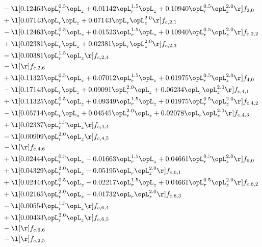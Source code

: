 \begin{alignat}{2}
& - \l[  0.12463 \opL_r^{0.5} \opL_z +  0.01142 \opL_r^{1.5} \opL_z +  0.10940 \opL_r^{0.5} \opL_z^{2.0}  \r] f_{2,0} \nonumber \\ 
& + \l[  0.07143 \opL_r \opL_z +  0.07143 \opL_r \opL_z^{2.0}  \r] f_{c,2,1} \nonumber \\ 
& - \l[  0.12463 \opL_r^{0.5} \opL_z +  0.01523 \opL_r^{1.5} \opL_z +  0.10940 \opL_r^{0.5} \opL_z^{2.0}  \r] f_{c,2,2} \nonumber \\ 
& + \l[  0.02381 \opL_r \opL_z +  0.02381 \opL_r \opL_z^{2.0}  \r] f_{c,2,3} \nonumber \\ 
& - \l[  0.00381 \opL_r^{1.5} \opL_z  \r] f_{c,2,4} \nonumber \\ 
& - \l[  \r] f_{c,2,6} \nonumber \\ 
& + \l[  0.11325 \opL_r^{0.5} \opL_z +  0.07012 \opL_r^{1.5} \opL_z +  0.01975 \opL_r^{0.5} \opL_z^{2.0}  \r] f_{4,0} \nonumber \\ 
& - \l[  0.17143 \opL_r \opL_z +  0.09091 \opL_r^{2.0} \opL_z +  0.06234 \opL_r \opL_z^{2.0}  \r] f_{c,4,1} \nonumber \\ 
& + \l[  0.11325 \opL_r^{0.5} \opL_z +  0.09349 \opL_r^{1.5} \opL_z +  0.01975 \opL_r^{0.5} \opL_z^{2.0}  \r] f_{c,4,2} \nonumber \\ 
& - \l[  0.05714 \opL_r \opL_z +  0.04545 \opL_r^{2.0} \opL_z +  0.02078 \opL_r \opL_z^{2.0}  \r] f_{c,4,3} \nonumber \\ 
& + \l[  0.02337 \opL_r^{1.5} \opL_z  \r] f_{c,4,4} \nonumber \\ 
& - \l[  0.00909 \opL_r^{2.0} \opL_z  \r] f_{c,4,5} \nonumber \\ 
& - \l[  \r] f_{c,4,6} \nonumber \\ 
& + \l[  0.02444 \opL_r^{0.5} \opL_z   -0.01663 \opL_r^{1.5} \opL_z +  0.04661 \opL_r^{0.5} \opL_z^{2.0}  \r] f_{6,0} \nonumber \\ 
& + \l[  0.04329 \opL_r^{2.0} \opL_z   -0.05195 \opL_r \opL_z^{2.0}  \r] f_{c,6,1} \nonumber \\ 
& + \l[  0.02444 \opL_r^{0.5} \opL_z   -0.02217 \opL_r^{1.5} \opL_z +  0.04661 \opL_r^{0.5} \opL_z^{2.0}  \r] f_{c,6,2} \nonumber \\ 
& + \l[  0.02165 \opL_r^{2.0} \opL_z   -0.01732 \opL_r \opL_z^{2.0}  \r] f_{c,6,3} \nonumber \\ 
& - \l[  0.00554 \opL_r^{1.5} \opL_z  \r] f_{c,6,4} \nonumber \\ 
& + \l[  0.00433 \opL_r^{2.0} \opL_z  \r] f_{c,6,5} \nonumber \\ 
& - \l[  \r] f_{c,6,6} \nonumber \\ 
& - \l[  \r] f_{c,2,5} \nonumber \\ 
\end{alignat} 


